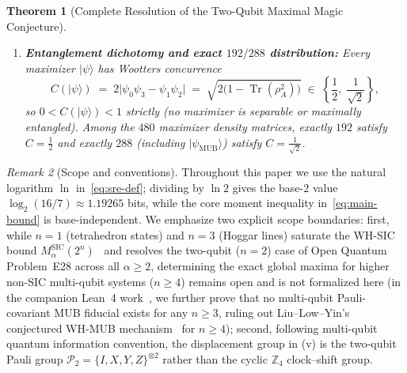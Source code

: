 \documentclass[11pt,a4paper]{article}
\theoremstyle{plain}
\newtheorem{theorem}{Theorem}[section]
\theoremstyle{definition}
\theoremstyle{remark}
\newtheorem{remark}[theorem]{Remark}
\newcommand{\Z}{\mathbb{Z}}
\newcommand{\ket}[1]{\lvert #1 \rangle}
\newcommand{\Tr}{\operatorname{Tr}}
\newcommand{\Pauli}{\mathcal{P}}
\newcommand{\psimub}{\ket{\psi_{\mathrm{MUB}}}}
\begin{document}
\begin{theorem}[Complete Resolution of the Two-Qubit Maximal Magic Conjecture]
\begin{enumerate}[label=\textup{(\roman*)}, leftmargin=2.2em]
  \item \textbf{Entanglement dichotomy and exact $192/288$ distribution:} Every maximizer $\ket{\psi}$ has Wootters concurrence
  \begin{equation}
    C(\ket{\psi}) \;=\; 2\lvert\psi_0\psi_3 - \psi_1\psi_2\rvert \;=\; \sqrt{2\bigl(1 - \Tr(\rho_A^2)\bigr)} \;\in\; \left\{\frac{1}{2},\; \frac{1}{\sqrt{2}}\right\},
  \end{equation}
  so $0 < C(\ket{\psi}) < 1$ strictly (no maximizer is separable or maximally entangled). Among the $480$ maximizer density matrices, exactly $192$ satisfy $C = \frac{1}{2}$ and exactly $288$ (including $\psimub$) satisfy $C = \frac{1}{\sqrt{2}}$.
\end{enumerate}
\end{theorem}

\begin{remark}[Scope and conventions]
Throughout this paper we use the natural logarithm $\ln$ in~\eqref{eq:sre-def}; dividing by $\ln 2$ gives the base-$2$ value $\log_2(16/7) \approx 1.19265$ bits, while the core moment inequality in~\eqref{eq:main-bound} is base-independent. We emphasize two explicit scope boundaries: first, while $n=1$ (tetrahedron states) and $n=3$ (Hoggar lines) saturate the WH-SIC bound $M_\alpha^{\mathrm{SIC}}(2^n)$~\cite{CuffaroFuchs2024} and  resolves the two-qubit ($n=2$) case of Open Quantum Problem~E28 across all $\alpha \ge 2$, determining the exact global maxima for higher non-SIC multi-qubit systems ($n \ge 4$) remains open and is not formalized here (in the companion Lean~4 work~\cite{Ye2026MultiQubitMUB}, we further prove that no multi-qubit Pauli-covariant MUB fiducial exists for any $n \ge 3$, ruling out Liu--Low--Yin's conjectured WH-MUB mechanism~\cite{LiuLowYin2026} for $n \ge 4$); second, following multi-qubit quantum information convention, the displacement group in (v) is the two-qubit Pauli group $\Pauli_2 = \{I, X, Y, Z\}^{\otimes 2}$ rather than the cyclic $\Z_4$ clock--shift group.
\end{remark}
\end{document}
